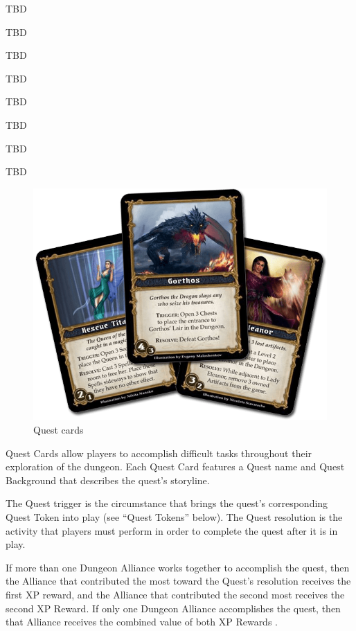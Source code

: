 TBD

TBD

TBD

TBD



TBD

TBD

TBD

TBD


\setlength{\columnsep}{2pt}%
\setlength{\intextsep}{2pt}%
\begin{figure}
\centering\includegraphics[width=.5\columnwidth]{images/quest_cards.png}
\caption*{Quest cards}
\end{figure}

Quest Cards allow players to accomplish difficult tasks
throughout their exploration of the dungeon. Each Quest Card
features a Quest name and Quest Background  that describes
the quest's storyline.

The Quest trigger  is the circumstance that brings the quest's
corresponding Quest Token into play (see “Quest Tokens”
below). The Quest resolution  is the activity that players must
perform in order to complete the quest after it is in play.

If more than one Dungeon Alliance works together to
accomplish the quest, then the Alliance that contributed the
most toward the Quest's resolution receives the first XP
reward, and the Alliance that contributed the second most
receives the second XP Reward. If only one Dungeon Alliance
accomplishes the quest, then that Alliance receives the
combined value of both XP Rewards .

